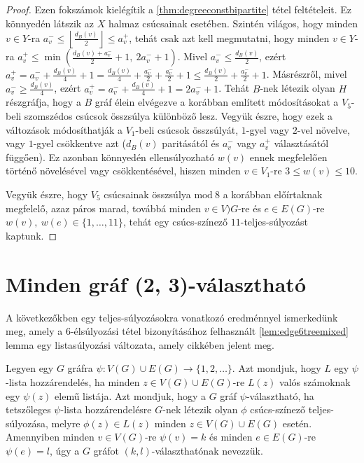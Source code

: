 \documentclass[12pt, a4paper]{report}
\theoremstyle{remark}
\theoremstyle{definition}
\begin{document}
\begin{proof}
Ezen fokszámok kielégítik a \ref{thm:degreeconstbipartite} tétel feltételeit. Ez könnyedén látszik az $X$ halmaz csúcsainak esetében. Szintén világos, hogy minden $v \in Y$-ra $a_v^- \leq \left\lfloor \frac{d_B(v)}{2} \right\rfloor \leq a_v^+$, tehát csak azt kell megmutatni, hogy minden $v \in Y$-ra $a_v^+ \leq \min \left( \frac{d_B(v) + a_v^-}{2} + 1,\ 2a_v^- + 1 \right)$. Mivel $a_v^- \leq \frac{d_B(v)}{2}$, ezért $a_v^+ = a_v^- + \frac{d_B(v)}{4} + 1 = \frac{d_B(v)}{4} + \frac{a_v^-}{2} + \frac{a_v^-}{2} + 1 \leq \frac{d_B(v)}{2} + \frac{a_v^-}{2} + 1$. Másrészről, mivel $a_v^- \geq \frac{d_B(v)}{4}$, ezért $a_v^+ = a_v^- + \frac{d_B(v)}{4} + 1 = 2a_v^- + 1$. Tehát $B$-nek létezik olyan $H$ részgráfja, hogy a $B$ gráf élein elvégezve a korábban említett módosításokat a $V_5$-beli szomszédos csúcsok összsúlya különböző lesz. Vegyük észre, hogy ezek a változások módosíthatják a $V_1$-beli csúcsok összsúlyát, $1$-gyel vagy $2$-vel növelve, vagy $1$-gyel csökkentve azt ($d_B(v)$ paritásától és $a_v^-$ vagy $a_v^+$ választásától függően). Ez azonban könnyedén ellensúlyozható $w(v)$ ennek megfelelően történő növelésével vagy csökkentésével, hiszen minden $v \in V_1$-re $3 \leq w(v) \leq 10$.

Vegyük észre, hogy $V_5$ csúcsainak összsúlya $\mathrm{mod}\ 8$ a korábban előírtaknak megfelelő, azaz páros marad, továbbá minden $v \in V)G$-re és $e \in E(G)$-re $w(v),\ w(e) \in \lbrace 1, \ldots, 11 \rbrace$, tehát egy csúcs-színező $11$-teljes-súlyozást kaptunk.
\end{proof}

\section{Minden gráf (2, 3)-választható}
A következőkben egy teljes-súlyozásokra vonatkozó eredménnyel ismerkedünk meg, amely a $6$-élsúlyozási tétel bizonyításához felhasznált \ref{lem:edge6treemixed} lemma egy listasúlyozási változata, amely \citeauthor{Wong2014} \cite{Wong2014} cikkében jelent meg. 

Legyen egy $G$ gráfra $\psi: V(G) \cup E(G) \rightarrow \lbrace 1, 2, \ldots \rbrace$. Azt mondjuk, hogy $L$ egy $\psi$-lista hozzárendelés, ha minden $z \in V(G) \cup E(G)$-re $L(z)$ valós számoknak egy $\psi(z)$ elemű listája. Azt mondjuk, hogy a $G$ gráf $\psi$-választható, ha tetszőleges $\psi$-lista hozzárendelésre $G$-nek létezik olyan $\phi$ csúcs-színező teljes-súlyozása, melyre $\phi(z) \in L(z)$ minden $z \in V(G) \cup E(G)$ esetén. Amennyiben minden $v \in V(G)$-re $\psi(v) = k$ és minden $e \in E(G)$-re $\psi(e) = l$, úgy a $G$ gráfot $(k, l)$-választhatónak nevezzük. 
\end{document}
